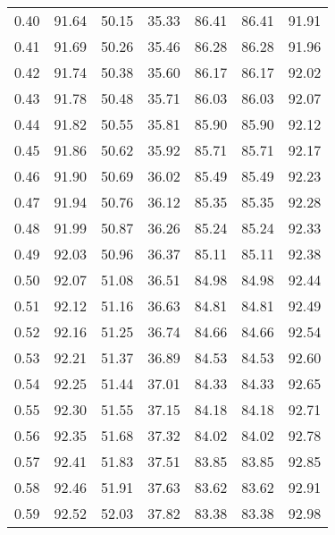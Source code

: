 \begin{tabular}{|c|c|c|c|c|c|c|}
      0.40 &     91.64 &     50.15 &      35.33 &   86.41 &      86.41 &         91.91 \\
      0.41 &     91.69 &     50.26 &      35.46 &   86.28 &      86.28 &         91.96 \\
      0.42 &     91.74 &     50.38 &      35.60 &   86.17 &      86.17 &         92.02 \\
      0.43 &     91.78 &     50.48 &      35.71 &   86.03 &      86.03 &         92.07 \\
      0.44 &     91.82 &     50.55 &      35.81 &   85.90 &      85.90 &         92.12 \\
      0.45 &     91.86 &     50.62 &      35.92 &   85.71 &      85.71 &         92.17 \\
      0.46 &     91.90 &     50.69 &      36.02 &   85.49 &      85.49 &         92.23 \\
      0.47 &     91.94 &     50.76 &      36.12 &   85.35 &      85.35 &         92.28 \\
      0.48 &     91.99 &     50.87 &      36.26 &   85.24 &      85.24 &         92.33 \\
      0.49 &     92.03 &     50.96 &      36.37 &   85.11 &      85.11 &         92.38 \\
      0.50 &     92.07 &     51.08 &      36.51 &   84.98 &      84.98 &         92.44 \\
      0.51 &     92.12 &     51.16 &      36.63 &   84.81 &      84.81 &         92.49 \\
      0.52 &     92.16 &     51.25 &      36.74 &   84.66 &      84.66 &         92.54 \\
      0.53 &     92.21 &     51.37 &      36.89 &   84.53 &      84.53 &         92.60 \\
      0.54 &     92.25 &     51.44 &      37.01 &   84.33 &      84.33 &         92.65 \\
      0.55 &     92.30 &     51.55 &      37.15 &   84.18 &      84.18 &         92.71 \\
      0.56 &     92.35 &     51.68 &      37.32 &   84.02 &      84.02 &         92.78 \\
      0.57 &     92.41 &     51.83 &      37.51 &   83.85 &      83.85 &         92.85 \\
      0.58 &     92.46 &     51.91 &      37.63 &   83.62 &      83.62 &         92.91 \\
      0.59 &     92.52 &     52.03 &      37.82 &   83.38 &      83.38 &         92.98 \\

\end{tabular}
